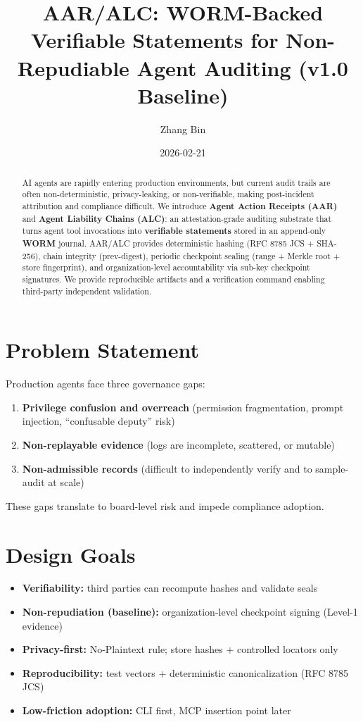\documentclass[11pt]{article}
\title{AAR/ALC: WORM-Backed Verifiable Statements for Non-Repudiable Agent Auditing (v1.0 Baseline)}
\author{Zhang Bin}
\date{2026-02-21}
\begin{document}
\maketitle

\begin{abstract}
AI agents are rapidly entering production environments, but current audit trails are often non-deterministic, privacy-leaking, or non-verifiable, making post-incident attribution and compliance difficult. We introduce \textbf{Agent Action Receipts (AAR)} and \textbf{Agent Liability Chains (ALC)}: an attestation-grade auditing substrate that turns agent tool invocations into \textbf{verifiable statements} stored in an append-only \textbf{WORM} journal. AAR/ALC provides deterministic hashing (RFC 8785 JCS + SHA-256), chain integrity (prev-digest), periodic checkpoint sealing (range + Merkle root + store fingerprint), and organization-level accountability via sub-key checkpoint signatures. We provide reproducible artifacts and a verification command enabling third-party independent validation.
\end{abstract}

\section{Problem Statement}
Production agents face three governance gaps:
\begin{enumerate}[label=(\arabic*)]
  \item \textbf{Privilege confusion and overreach} (permission fragmentation, prompt injection, ``confusable deputy'' risk)
  \item \textbf{Non-replayable evidence} (logs are incomplete, scattered, or mutable)
  \item \textbf{Non-admissible records} (difficult to independently verify and to sample-audit at scale)
\end{enumerate}
These gaps translate to board-level risk and impede compliance adoption.

\section{Design Goals}
\begin{itemize}
  \item \textbf{Verifiability:} third parties can recompute hashes and validate seals
  \item \textbf{Non-repudiation (baseline):} organization-level checkpoint signing (Level-1 evidence)
  \item \textbf{Privacy-first:} No-Plaintext rule; store hashes + controlled locators only
  \item \textbf{Reproducibility:} test vectors + deterministic canonicalization (RFC 8785 JCS)
  \item \textbf{Low-friction adoption:} CLI first, MCP insertion point later
\end{itemize}
\end{document}
